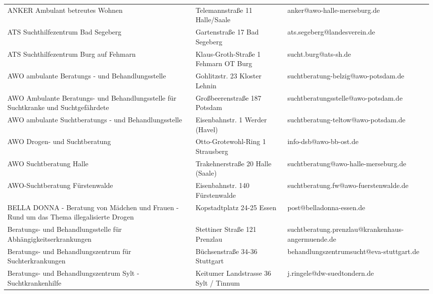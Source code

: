 {\begin{xltabular}{\textwidth} {
 >{\raggedright\arraybackslash}p{5cm}
 >{\raggedright\arraybackslash}X
 >{\raggedright\arraybackslash}p{5cm} }
ANKER Ambulant betreutes Wohnen & Telemannstraße 11 Halle/Saale & anker@awo-halle-merseburg.de \\
ATS Suchthilfezentrum Bad Segeberg & Gartenstraße 17 Bad Segeberg & ats.segeberg@landesverein.de \\
ATS Suchthilfezentrum Burg auf Fehmarn & Klaus-Groth-Straße 1 Fehmarn OT Burg & sucht.burg@ats-sh.de \\
AWO ambulante Beratungs - und Behandlungsstelle & Gohlitzstr. 23 Kloster Lehnin & suchtberatung-belzig@awo-potsdam.de \\
AWO Ambulante Beratungs- und Behandlungsstelle für Suchtkranke und Suchtgefährdete & Großbeerenstraße 187 Potsdam & suchtberatungsstelle@awo-potsdam.de \\
AWO ambulante Suchtberatungs - und Behandlungsstelle & Eisenbahnstr. 1 Werder (Havel) & suchtberatung-teltow@awo-potsdam.de \\
AWO Drogen- und Suchtberatung & Otto-Grotewohl-Ring 1 Strausberg & info-dsb@awo-bb-ost.de \\
AWO Suchtberatung Halle & Trakehnerstraße 20 Halle (Saale) & suchtberatung@awo-halle-merseburg.de \\
AWO-Suchtberatung Fürstenwalde & Eisenbahnstr. 140 Fürstenwalde & suchtberatung.fw@awo-fuerstenwalde.de \\
BELLA DONNA - Beratung von Mädchen und Frauen - Rund um das Thema illegalisierte Drogen & Kopstadtplatz 24-25 Essen & post@belladonna-essen.de \\
Beratungs- und Behandlungsstelle für Abhängigkeitserkrankungen & Stettiner Straße 121 Prenzlau & suchtberatung.prenzlau@krankenhaus-angermuende.de \\
Beratungs- und Behandlungszentrum für Suchterkrankungen & Büchsenstraße 34-36 Stuttgart & behandlungszentrumsucht@eva-stuttgart.de \\
Beratungs- und Behandlungszentrum Sylt - Suchtkrankenhilfe & Keitumer Landstrasse 36 Sylt / Tinnum & j.ringele@dw-suedtondern.de \\

\end{xltabular}}
